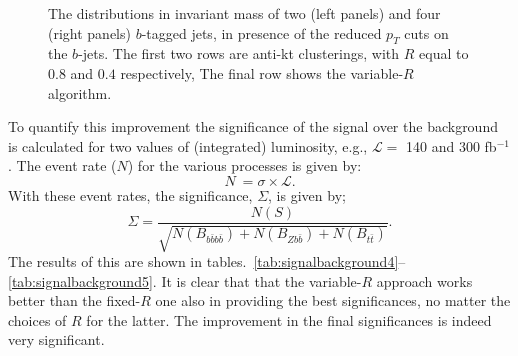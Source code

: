 \begin{figure}[htb!]
	\caption{The distributions in invariant mass of two (left panels) and four (right panels) $b$-tagged jets, in presence of the
  reduced $p_T$ cuts on the $b$-jets.
  The first two rows are anti-kt clusterings, with \(R\) equal to \(0.8\) and \(0.4\) respectively,
  The final row shows the variable-\(R\) algorithm.}
\label{fig:invmass2}
\end{figure}


To quantify this improvement the significance of the signal over the background is calculated for two values of (integrated)  luminosity, e.g.,  ${\mathcal{L}}=$  140 and 300 fb$^{-1}$.
The event rate ($N$) for the various processes is given by:
%
\begin{equation}
N \ = \sigma \times \mathcal{L}.
\end{equation}
%
With these event rates, the significance, $\Sigma$, is given by;
%
\begin{equation}
\Sigma = \frac{N(S)}{\sqrt{N(B_{b\bar{b}b\bar{b}})+N(B_{Zb\bar{b}})+N(B_{t\bar{t}})}}.
\end{equation}
%
The results of this are shown in tables.~\ref{tab:signalbackground4}--\ref{tab:signalbackground5}.
It is clear that that the variable-$R$ approach works better than the fixed-$R$ one also in providing the best significances, no matter the choices of $R$ for the latter.  The improvement in the final significances is indeed very significant.



\begin{table}[!h]
\begin{center}
\caption{\label{tab:signalbackground4} Final $\Sigma$ values calculated for signal and backgrounds for ${\cal L}=140$ fb$^{-1}$  upon enforcing the reduced cuts plus the mass selection criteria $|m_{bbbb}-m_H|< 20$ GeV and $|m_{bb} - m_h|< 15$ GeV for the various jet reconstruction procedures.}
\end{center}
\end{table}

